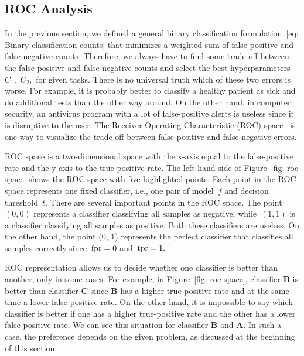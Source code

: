 \subsection{ROC Analysis}\label{subsec: ROC}

In the previous section, we defined a general binary classification formulation~\eqref{eq: Binary classification counts} that minimizes a weighted sum of false-positive and false-negative counts. Therefore, we always have to find some trade-off between the false-positive and false-negative counts and select the best hyperparameters~$C_1,$ $C_2,$ for given tasks. There is no universal truth which of these two errors is worse. For example, it is probably better to classify a healthy patient as sick and do additional tests than the other way around. On the other hand, in computer security, an antivirus program with a lot of false-positive alerts is useless since it is disruptive to the user. The Receiver Operating Characteristic (ROC) space~\cite{egan1975signal, fawcett2006introduction} is one way to visualize the trade-off between false-positive and false-negative errors.

ROC space is a two-dimensional space with the x-axis equal to the false-positive rate and the y-axis to the true-positive rate. The left-hand side of Figure~\ref{fig: roc space} shows the ROC space with five highlighted points. Each point in the ROC space represents one fixed classifier, i.e., one pair of model~$f$ and decision threshold~$t.$ There are several important points in the ROC space. The point~$(0, 0)$ represents a classifier classifying all samples as negative, while~$(1, 1)$ is a classifier classifying all samples as positive. Both these classifiers are useless. On the other hand, the point (0, 1) represents the perfect classifier that classifies all samples correctly since~$\operatorname{fpr} = 0$ and~$\operatorname{tpr} = 1.$

ROC representation allows us to decide whether one classifier is better than another, only in some cases. For example, in Figure~\ref{fig: roc space}, classifier \textbf{B} is better than classifier \textbf{C} since \textbf{B} has a higher true-positive rate and at the same time a lower false-positive rate. On the other hand, it is impossible to say which classifier is better if one has a higher true-positive rate and the other has a lower false-positive rate. We can see this situation for classifier \textbf{B} and \textbf{A}. In such a case, the preference depends on the given problem, as discussed at the beginning of this section.

